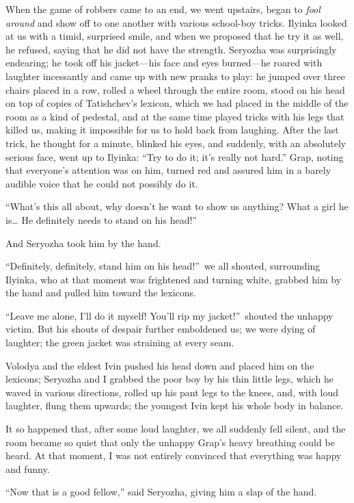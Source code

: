 When the game of robbers came to an end, we went upstairs, began to \emph{fool around} and show off to one another with various school-boy tricks. Ilyinka looked at us with a timid, surprised smile, and when we proposed that he try it as well, he refused, saying that he did not have the strength. Seryozha was surprisingly endearing; he took off his jacket---his face and eyes burned---he roared with laughter incessantly and came up with new pranks to play: he jumped over three chairs placed in a row, rolled a wheel through the entire room, stood on his head on top of copies of Tatishchev's lexicon, which we had placed in the middle of the room as a kind of pedestal, and at the same time played tricks with his legs that killed us, making it impossible for us to hold back from laughing. After the last trick, he thought for a minute, blinked his eyes, and suddenly, with an absolutely serious face, went up to Ilyinka: ``Try to do it; it's really not hard.'' Grap, noting that everyone's attention was on him, turned red and assured him in a barely audible voice that he could not possibly do it. %

``What's this all about, why doesn't he want to show us anything? What a girl he is\ldots{} He definitely needs to stand on his head!'' %

And Seryozha took him by the hand.

``Definitely, definitely, stand him on his head!''~we all shouted, surrounding Ilyinka, who at that moment was frightened and turning white, grabbed him by the hand and pulled him toward the lexicons.

``Leave me alone, I'll do it myself! You'll rip my jacket!''~shouted the unhappy victim. But his shouts of despair further emboldened us; we were dying of laughter; the green jacket was straining at every seam.

Volodya and the eldest Ivin pushed his head down and placed him on the lexicons; Seryozha and I grabbed the poor boy by his thin little legs, which he waved in various directions, rolled up his pant legs to the knees, and, with loud laughter, flung them upwards; the youngest Ivin kept his whole body in balance.

It so happened that, after some loud laughter, we all suddenly fell silent, and the room became so quiet that only the unhappy Grap's heavy breathing could be heard. At that moment, I was not entirely convinced that everything was happy and funny.

``Now that is a good fellow,'' said Seryozha, giving him a slap of the hand. %

